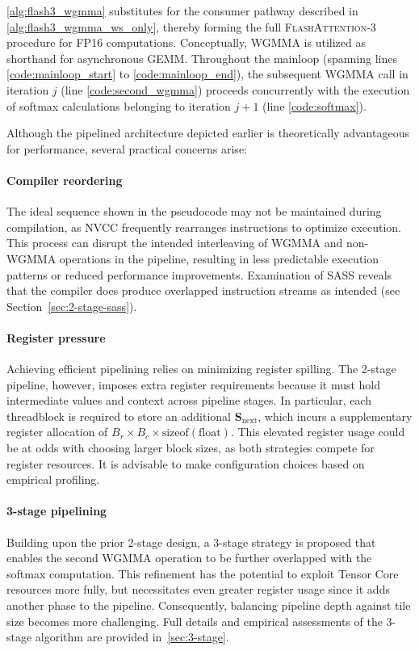 \cref{alg:flash3_wgmma} substitutes for the consumer pathway described in \cref{alg:flash3_wgmma_ws_only}, thereby forming the full \textsc{FlashAttention-3} procedure for FP16 computations. Conceptually, WGMMA is utilized as shorthand for asynchronous GEMM. Throughout the mainloop (spanning lines \ref{code:mainloop_start} to \ref{code:mainloop_end}), the subsequent WGMMA call in iteration $j$ (line \ref{code:second_wgmma}) proceeds concurrently with the execution of softmax calculations belonging to iteration $j+1$ (line \ref{code:softmax}).

Although the pipelined architecture depicted earlier is theoretically advantageous for performance, several practical concerns arise:
\paragraph{Compiler reordering} The ideal sequence shown in the pseudocode may not be maintained during compilation, as NVCC frequently rearranges instructions to optimize execution. This process can disrupt the intended interleaving of WGMMA and non-WGMMA operations in the pipeline, resulting in less predictable execution patterns or reduced performance improvements. Examination of SASS reveals that the compiler does produce overlapped instruction streams as intended (see Section~\ref{sec:2-stage-sass}).
\paragraph{Register pressure} Achieving efficient pipelining relies on minimizing register spilling. The 2-stage pipeline, however, imposes extra register requirements because it must hold intermediate values and context across pipeline stages. In particular, each threadblock is required to store an additional $\mathbf{S}_{\mathrm{next}}$, which incurs a supplementary register allocation of $B_r \times B_c \times \text{sizeof}(\text{float})$. This elevated register usage could be at odds with choosing larger block sizes, as both strategies compete for register resources. It is advisable to make configuration choices based on empirical profiling.
\paragraph{3-stage pipelining} Building upon the prior 2-stage design, a 3-stage strategy is proposed that enables the second WGMMA operation to be further overlapped with the softmax computation. This refinement has the potential to exploit Tensor Core resources more fully, but necessitates even greater register usage since it adds another phase to the pipeline. Consequently, balancing pipeline depth against tile size becomes more challenging. Full details and empirical assessments of the 3-stage algorithm are provided in~\cref{sec:3-stage}.

